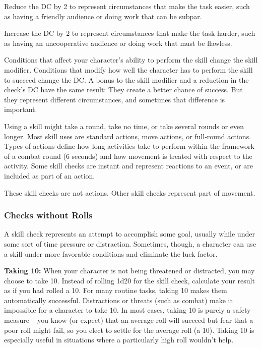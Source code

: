 \begin{multicols}{2}
\begin{enumerate*}
	\item Reduce the DC by 2 to represent circumstances that make the task easier, such as having a friendly audience or doing work that can be subpar.
	
	\item Increase the DC by 2 to represent circumstances that make the task harder, such as having an uncooperative audience or doing work that must be flawless.
\end{enumerate*}

Conditions that affect your character's ability to perform the skill change the skill modifier. Conditions that modify how well the character has to perform the skill to succeed change the DC. A bonus to the skill modifier and a reduction in the check's DC have the same result: They create a better chance of success. But they represent different circumstances, and sometimes that difference is important.

Using a skill might take a round, take no time, or take several rounds or even longer. Most skill uses are standard actions, move actions, or full-round actions. Types of actions define how long activities take to perform within the framework of a combat round (6 seconds) and how movement is treated with respect to the activity. Some skill checks are instant and represent reactions to an event, or are included as part of an action.

These skill checks are not actions. Other skill checks represent part of movement.

\subsubsection{Checks without Rolls}

A skill check represents an attempt to accomplish some goal, usually while under some sort of time pressure or distraction. Sometimes, though, a character can use a skill under more favorable conditions and eliminate the luck factor.

\textbf{Taking 10:} When your character is not being threatened or distracted, you may choose to take 10. Instead of rolling 1d20 for the skill check, calculate your result as if you had rolled a 10. For many routine tasks, taking 10 makes them automatically successful. Distractions or threats (such as combat) make it impossible for a character to take 10. In most cases, taking 10 is purely a safety measure -- you know (or expect) that an average roll will succeed but fear that a poor roll might fail, so you elect to settle for the average roll (a 10). Taking 10 is especially useful in situations where a particularly high roll wouldn't help.


\end{multicols}
